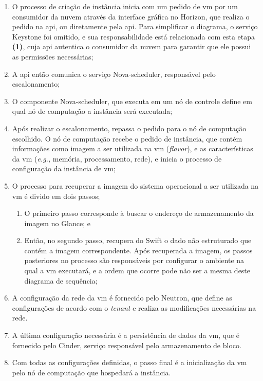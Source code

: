 \begin{enumerate}[label*=\arabic*.]
\item O processo de criação de instância inicia com um pedido de \ac{vm} por um consumidor da nuvem através da interface gráfica no Horizon, que realiza o pedido na \ac{api}, ou diretamente pela \ac{api}.
%
Para simplificar o diagrama, o serviço Keystone foi omitido, e sua responsabilidade está relacionada com esta etapa \textbf{(1)}, cuja \ac{api} autentica o consumidor da nuvem para garantir que ele possui as permissões necessárias;
%
\item A \ac{api} então comunica o serviço Nova-scheduler, responsável pelo escalonamento;

\item O componente Nova-scheduler, que executa em um nó de controle define em qual nó de computação a instância será executada; 

\item Após realizar o escalonamento, repassa o pedido para o nó de computação escolhido. O nó de computação recebe o pedido de instância, que contém informações como imagem a ser utilizada na \ac{vm} (\textit{flavor}), e as características da \ac{vm} (\textit{e.g.,} memória, processamento, rede), e inicia o processo de configuração da instância de \ac{vm};

\item O processo para recuperar a imagem do sistema operacional a ser utilizada na \ac{vm} é divido em dois passos;

\begin{enumerate}[label*=\arabic*.]

\item O primeiro passo corresponde à buscar o endereço de armazenamento da imagem no Glance; e

\item Então, no segundo passo, recupera do Swift o dado não estruturado que contém a imagem correspondente. Após recuperada a imagem, os passos posteriores no processo são responsáveis por configurar o ambiente na qual a \ac{vm} executará, e a ordem que ocorre pode não ser a mesma deste diagrama de sequência;

\end{enumerate}

\item A configuração da rede da \ac{vm} é fornecido pelo Neutron, que define as configurações de acordo com o \textit{tenant} e realiza as modificações necessárias na rede.
%
\item A última configuração necessária é a persistência de dados da \ac{vm}, que é fornecido pelo Cinder, serviço responsável pelo armazenamento de bloco.
%
\item Com todas as configurações definidas, o passo final é a inicialização da \ac{vm} pelo nó de computação que hospedará a instância.
\end{enumerate}

